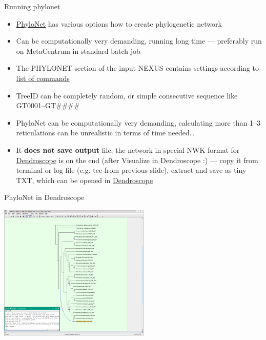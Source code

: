 \documentclass[compress, ucs, xelatex, 11pt, xcolor=x11names, aspectratio=169,
	hyperref={
		bookmarks=true,
		unicode=true,
		colorlinks=true,
		pdftitle={HybSeq course},
		plainpages=false,
		pdfauthor={Vojtech Zeisek},
		pdfsubject={Practical processing of HybSeq target enrichment sequencing data on computing grids like MetaCentrum},
		pdfcreator={XeLaTeX},
		pdfkeywords={BASH, command line, GNU, HybSeq, Linux, MetaCentrum, sequencing shell, target enrichment},
		linkcolor=Turquoise4, %
		anchorcolor=DodgerBlue4, %
		citecolor=DodgerBlue4, %
		filecolor=DodgerBlue4, %
		menucolor=Tan4, %
		urlcolor=DarkOliveGreen4, %
		pdftex},
	url={hyphens, lowtilde} %
	]{beamer}
\renewcommand{\texttt}[1]{\colorbox{Cornsilk2}{{\ttfamily #1}}}
\begin{document}
\begin{frame}{Running phylonet}
	\begin{itemize}
		\item \href{https://phylogenomics.rice.edu/html/phylonet.html}{PhyloNet} has various options how to create phylogenetic network
		\item Can be computationally very demanding, running long time --- preferably run on MetaCentrum in standard batch job
		\item The \texttt{PHYLONET} section of the input NEXUS contains settings according to \href{https://wiki.rice.edu/confluence/display/PHYLONET/List+of+PhyloNet+Commands}{list of commands}
		\item TreeID can be completely random, or simple consecutive sequence like GT0001--GT\#\#\#\#
		\item PhyloNet can be computationally very demanding, calculating more than 1--3 reticulations can be unrealistic in terms of time needed\ldots
		\item It \textbf{does not save output} file, the network in special NWK format for \href{https://www.wsi.uni-tuebingen.de/lehrstuehle/algorithms-in-bioinformatics/software/dendroscope/}{Dendroscope} is on the end (after \texttt{Visualize in Dendroscope :}) --- copy it from terminal or log file (e.g. \texttt{tee} from previous slide), extract and save as tiny TXT, which can be opened in \href{https://www.wsi.uni-tuebingen.de/lehrstuehle/algorithms-in-bioinformatics/software/dendroscope/}{Dendroscope}
	\end{itemize}
\end{frame}

\begin{frame}{PhyloNet in Dendroscope}
	\begin{center}
		\includegraphics[height=6.5cm]{dendroscope.png}
	\end{center}
\end{frame}
\end{document}
